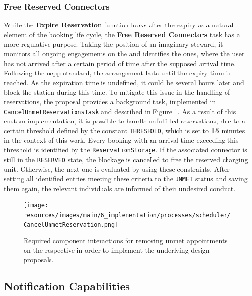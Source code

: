 \newpage

\subsubsection{Free Reserved Connectors}
\label{ch:Implementation:sec:Reservation System:ssec:Scheduling Capabilities:sssec:Free Reserved Connectors}

While the \textbf{Expire Reservation} function looks after the expiry as a natural element of the booking life cycle, the \textbf{Free Reserved Connectors} task has a more regulative purpose.
Taking the position of an imaginary steward, it monitors all ongoing engagements on the  and identifies the ones, where the user has not arrived after a certain period of time after the supposed arrival time.
Following the \acrshort{ocpp} standard, the arrangement lasts until the expiry time is reached. As the expiration time is undefined, it could be several hours later and block the station during this time. 
To mitigate this issue in the handling of reservations, the proposal provides a background task, implemented in \texttt{CancelUnmetReservationsTask} and described in Figure \ref{fig:free-connector-seqflow}.
As a result of this custom implementation, it is possible to handle unfulfilled reservations, due to a certain threshold defined by the constant \texttt{THRESHOLD}, which is set to \textbf{15} minutes in the context of this work.
Every booking with an arrival time exceeding this threshold is identified by the \texttt{ReservationStorage}. If the associated connector is still in the \texttt{RESERVED} state, the blockage is cancelled to free the reserved charging unit.
Otherwise, the next one is evaluated by using these constraints.
After setting all identified entries meeting these criteria to the \texttt{UNMET} status and saving them again, the relevant individuals are informed of their undesired conduct.

\begin{figure}[h]
    \centering
    \texttt{[image: resources/images/main/6\_implementation/processes/scheduler/CancelUnmetReservation.png]}
    \caption{Required component interactions for removing unmet appointments on the respective  in order to implement the underlying design proposals.}
    \label{fig:free-connector-seqflow}
\end{figure}

\newpage

\subsection{Notification Capabilities}
\label{ch:Implementation:sec:Reservation System:ssec:Notification Capabilities}

